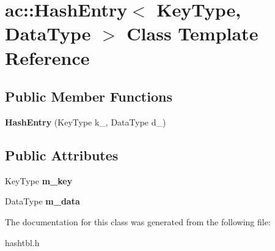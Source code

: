 \hypertarget{classac_1_1HashEntry}{}\section{ac\+:\+:Hash\+Entry$<$ Key\+Type, Data\+Type $>$ Class Template Reference}
\label{classac_1_1HashEntry}
\subsection*{Public Member Functions}
\begin{DoxyCompactItemize}
\item 
\mbox{\label{classac_1_1HashEntry_ad65fb970bcac8732297080e444851618}} 
{\bfseries Hash\+Entry} (Key\+Type k\+\_\+, Data\+Type d\+\_\+)
\end{DoxyCompactItemize}
\subsection*{Public Attributes}
\begin{DoxyCompactItemize}
\item 
\mbox{\label{classac_1_1HashEntry_a8fbb44b97c85a8b5f3894cb99fa8b18a}} 
Key\+Type {\bfseries m\+\_\+key}
\item 
\mbox{\label{classac_1_1HashEntry_aff3da91af62ba88e418dfa046e0432cf}} 
Data\+Type {\bfseries m\+\_\+data}
\end{DoxyCompactItemize}


The documentation for this class was generated from the following file\+:\begin{DoxyCompactItemize}
\item 
hashtbl.\+h\end{DoxyCompactItemize}
